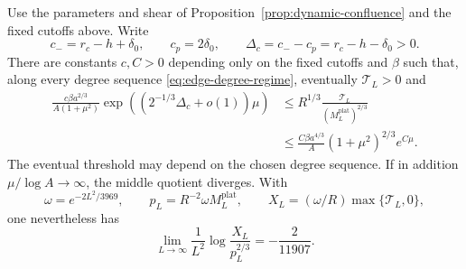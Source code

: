 \begin{theorem}
\label{thm:parabolic-shear}
Use the parameters and shear of Proposition~\ref{prop:dynamic-confluence}
and the fixed cutoffs above.  Write
\[
 c_-=r_c-h+\delta_0,\qquad c_p=2\delta_0,\qquad
 \Delta_c=c_--c_p=r_c-h-\delta_0>0.
\]
There are constants $c,C>0$ depending only on the fixed cutoffs and
$\beta$ such that, along every degree sequence
\eqref{eq:edge-degree-regime}, eventually $\mathcal T_L>0$ and
\begin{align}
 \frac{c\beta a^{2/3}}{A(1+\mu^2)}
  \exp\!\left((2^{-1/3}\Delta_c+o(1))\mu\right)
 &\le R^{1/3}\frac{\mathcal T_L}{(M_L^{\mathrm{plat}})^{2/3}}
 \label{eq:parabolic-residual-lower}\\
 &\le\frac{C\beta a^{4/3}}A(1+\mu^2)^{2/3}e^{C\mu}.
 \label{eq:parabolic-residual-upper}
\end{align}
The eventual threshold may depend on the chosen degree sequence.
If in addition $\mu/\log A\to\infty$, the middle quotient diverges.
With
\[
 \omega=e^{-2L^2/3969},\qquad
 p_L=R^{-2}\omega M_L^{\mathrm{plat}},\qquad
 X_L=(\omega/R)\max\{\mathcal T_L,0\},
\]
one nevertheless has
\begin{equation}\label{eq:parabolic-normalized-rate}
 \lim_{L\to\infty}\frac1{L^2}\log\frac{X_L}{p_L^{2/3}}
 =-\frac2{11907}.
\end{equation}
\end{theorem}

